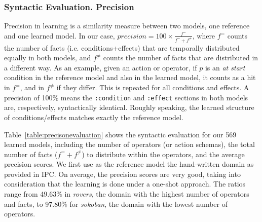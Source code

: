 \documentclass[10pt,journal,compsoc]{IEEEtran}
\begin{document}
\subsubsection{Syntactic Evaluation. Precision}


Precision in learning is a similarity measure between two models, one reference and one learned model. In our case, $precision=100 \times \frac{f^{=}}{f^{=} + f^{\neq}}$, where $f^{=}$ counts the number of facts (i.e. conditions+effects) that are temporally distributed equally in both models, and $f^{\neq}$ counts the number of facts that are distributed in a different way. 
As an example, given an action or operator, if $p$ is an \textit{at start} condition in the reference model and also in the learned model, it counts as a hit in $f^{=}$, and in $f^{\neq}$ if they differ. This is repeated for all conditions and effects. A precision of 100\% means the \texttt{:condition} and \texttt{:effect} sections in both models are, respectively, syntactically identical. Roughly speaking, the learned structure of conditions/effects matches exactly the reference model.

Table~\ref{table:precisonevaluation} shows the syntactic evaluation for our 569 learned models, including the number of operators (or action schemas), the total number of facts ($f^{=}+f^{\neq}$) to distribute within the operators, and the average precision scores. We first use as the reference model the hand-written domain as provided in IPC.
On average, the precision scores are very good, taking into consideration that the learning is done under a one-shot approach. The ratios range from 49.63\% in \textit{rovers}, the domain with the highest number of operators and facts, to 97.80\% for \textit{sokoban}, the domain with the lowest number of operators.
\end{document}
